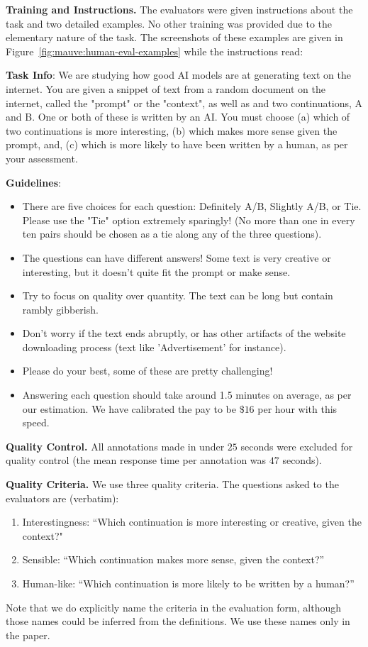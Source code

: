 \documentclass{article}
\newcommand{\myparagraph}[1]{\par\noindent\textbf{{#1}.}} %
\theoremstyle{definition}
\begin{document}
\myparagraph{Training and Instructions}
The evaluators were given instructions about the task 
and two detailed examples. No other training was provided due to the elementary nature of the task. The screenshots of these 
examples are given in Figure~\ref{fig:mauve:human-eval-examples} 
while the instructions read:
\begin{displayquote}
{\small

\textbf{Task Info}: We are studying how good AI models are at generating text on the internet. You are given a snippet of text from a random document on the internet, called the "prompt" or the "context", as well as and two continuations, A and B. One or both of these is written by an AI. You must choose (a) which of two continuations is more interesting, (b) which makes more sense given the prompt, and, (c) which is more likely to have been written by a human, as per your assessment.

\textbf{Guidelines}:
\begin{itemize}[itemsep=0cm,leftmargin=0.5cm]
    \item There are five choices for each question: Definitely A/B, Slightly A/B, or Tie. Please use the "Tie" option extremely sparingly! (No more than one in every ten pairs should be chosen as a tie along any of the three questions).
    \item The questions can have different answers! Some text is very creative or interesting, but it doesn't quite fit the prompt or make sense.
    \item Try to focus on quality over quantity. The text can be long but contain rambly gibberish.
    \item Don't worry if the text ends abruptly, or has other artifacts of the website downloading process (text like 'Advertisement' for instance).
    \item Please do your best, some of these are pretty challenging!
    \item Answering each question should take around 1.5 minutes on average, as per our estimation. We have calibrated the pay to be $\$16$ per hour with this speed.
\end{itemize}
}
\end{displayquote}

\myparagraph{Quality Control}
All annotations made in under $25$ seconds were excluded
for quality control
(the mean response time per annotation was $47$ seconds).

\myparagraph{Quality Criteria}
We use three quality criteria. The questions asked to the evaluators are (verbatim):
\begin{enumerate}[itemsep=0cm,leftmargin=0.5cm]
\item Interestingness: ``Which continuation is more interesting or creative, given the context?"
\item Sensible: ``Which continuation makes more sense, given the context?''
\item Human-like: ``Which continuation is more likely to be written by a human?''
\end{enumerate}
Note that we do explicitly name the criteria in the evaluation form, although those names could be inferred from the definitions. We use these names only in the paper. 
\end{document}
